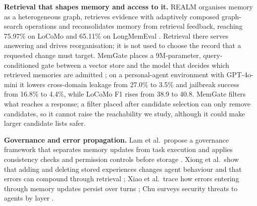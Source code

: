 \IfFileExists{IEEEtran.cls}{\documentclass[journal]{IEEEtran}\def\HAVEIEEE{1}}{\documentclass[10pt,twocolumn]{article}\usepackage[margin=0.7in,columnsep=0.25in]{geometry}}
\begin{document}
\textbf{Retrieval that shapes memory and access to it.} REALM organises memory as a heterogeneous graph, retrieves evidence with adaptively composed graph-search operations and reconsolidates memory from retrieval feedback, reaching 75.97\% on LoCoMo and 65.11\% on LongMemEval \cite{song2026realm}. Retrieval there serves answering and drives reorganisation; it is not used to choose the record that a requested change must target. MemGate places a 9M-parameter, query-conditioned gate between a vector store and the model that decides which retrieved memories are admitted \cite{zhang2026memgate}; on a personal-agent environment with GPT-4o-mini it lowers cross-domain leakage from 27.0\% to 3.5\% and jailbreak success from 16.8\% to 4.4\%, while LoCoMo F1 rises from 38.9 to 40.8. MemGate filters what reaches a response; a filter placed after candidate selection can only remove candidates, so it cannot raise the reachability we study, although it could make larger candidate lists safer.

\textbf{Governance and error propagation.} Lam et al.\ propose a governance framework that separates memory updates from task execution and applies consistency checks and permission controls before storage \cite{lam2026ssgm}. Xiong et al.\ show that adding and deleting stored experiences changes agent behaviour and that errors can compound through retrieval \cite{xiong2025memory}; Xiao et al.\ trace how errors entering through memory updates persist over turns \cite{xiao2026errors}; Chu surveys security threats to agents by layer \cite{chu2026survey}.
\end{document}
